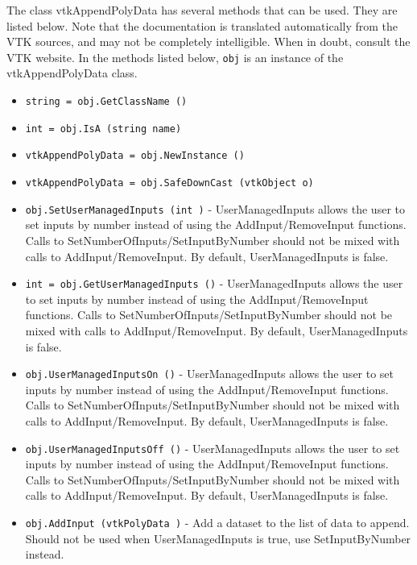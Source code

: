 The class vtkAppendPolyData has several methods that can be used.
  They are listed below.
Note that the documentation is translated automatically from the VTK sources,
and may not be completely intelligible.  When in doubt, consult the VTK website.
In the methods listed below, \verb|obj| is an instance of the vtkAppendPolyData class.
\begin{itemize}
\item  \verb|string = obj.GetClassName ()|

\item  \verb|int = obj.IsA (string name)|

\item  \verb|vtkAppendPolyData = obj.NewInstance ()|

\item  \verb|vtkAppendPolyData = obj.SafeDownCast (vtkObject o)|

\item  \verb|obj.SetUserManagedInputs (int )| -  UserManagedInputs allows the user to set inputs by number instead of
 using the AddInput/RemoveInput functions. Calls to
 SetNumberOfInputs/SetInputByNumber should not be mixed with calls
 to AddInput/RemoveInput. By default, UserManagedInputs is false.

\item  \verb|int = obj.GetUserManagedInputs ()| -  UserManagedInputs allows the user to set inputs by number instead of
 using the AddInput/RemoveInput functions. Calls to
 SetNumberOfInputs/SetInputByNumber should not be mixed with calls
 to AddInput/RemoveInput. By default, UserManagedInputs is false.

\item  \verb|obj.UserManagedInputsOn ()| -  UserManagedInputs allows the user to set inputs by number instead of
 using the AddInput/RemoveInput functions. Calls to
 SetNumberOfInputs/SetInputByNumber should not be mixed with calls
 to AddInput/RemoveInput. By default, UserManagedInputs is false.

\item  \verb|obj.UserManagedInputsOff ()| -  UserManagedInputs allows the user to set inputs by number instead of
 using the AddInput/RemoveInput functions. Calls to
 SetNumberOfInputs/SetInputByNumber should not be mixed with calls
 to AddInput/RemoveInput. By default, UserManagedInputs is false.

\item  \verb|obj.AddInput (vtkPolyData )| -  Add a dataset to the list of data to append. Should not be
 used when UserManagedInputs is true, use SetInputByNumber instead.


\end{itemize}

